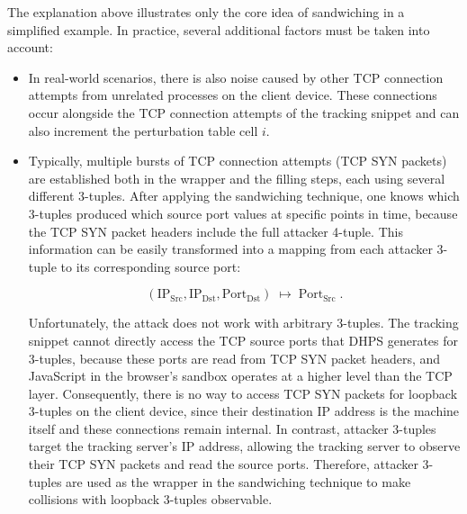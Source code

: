 \documentclass[twocolumn]{report}
\begin{document}
The explanation above illustrates only the \alert{core idea of sandwiching} in a simplified example. In practice, several additional factors must be taken into account:

\begin{itemize}
	\item {} In real-world scenarios, there is also \alert{noise} caused by other TCP connection attempts from unrelated processes on the client device. These connections occur alongside the TCP connection attempts of the tracking snippet and can also increment the perturbation table cell \( i \).
	\item {} Typically, multiple \alert{bursts of TCP connection attempts} (TCP SYN packets) are established both in the wrapper and the filling steps, each using several different 3-tuples. After applying the sandwiching technique, one knows which 3-tuples produced which source port values at specific points in time, because the \alert{TCP SYN packet headers} include the full attacker 4-tuple. This information can be easily transformed into a mapping from each attacker 3-tuple to its corresponding source port:

	\vspace{0.2cm}
	\begin{minipage}{\columnwidth}
		\[
			(\mathrm{IP_{Src}}, \mathrm{IP_{Dst}}, \mathrm{Port_{Dst}}) \;\mapsto\; \mathrm{Port_{Src}}\;\text{.}
		\]
	\end{minipage}
	\vspace{0cm}

	 Unfortunately, the attack does not work with arbitrary 3-tuples. The tracking snippet cannot directly access the TCP source ports that DHPS generates for 3-tuples, because these ports are read from TCP SYN packet headers, and JavaScript in the \alert{browser’s sandbox} operates at a higher level than the TCP layer. Consequently, there is no way to access TCP SYN packets for \alert{loopback 3-tuples} on the client device, since their destination IP address is the machine itself and these connections remain internal. In contrast, \alert{attacker 3-tuples} target the tracking server’s IP address, allowing the \alert{tracking server} to observe their TCP SYN packets and read the source ports. Therefore, attacker 3-tuples are used as the wrapper in the sandwiching technique to make collisions with loopback 3-tuples observable.
\end{itemize}
\end{document}
